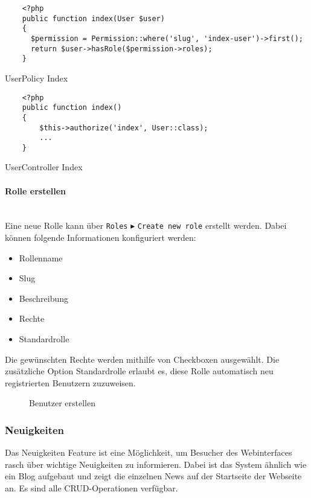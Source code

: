 \begin{listing}[H]
  \begin{verbatim}
    <?php
    public function index(User $user)
    {
      $permission = Permission::where('slug', 'index-user')->first();
      return $user->hasRole($permission->roles);
    }
  \end{verbatim}
  \caption{UserPolicy Index}
\end{listing}

\begin{listing}[H]
  \begin{verbatim}
    <?php
    public function index()
    {
        $this->authorize('index', User::class);
        ...
    }
  \end{verbatim}
  \caption{UserController Index}
\end{listing}

\paragraph{Rolle erstellen}\mbox{}\\
Eine neue Rolle kann über \verb|Roles| $\blacktriangleright$ 
\verb|Create new role| erstellt werden. Dabei können
folgende Informationen konfiguriert werden:

\begin{itemize}
  \item Rollenname
  \item Slug
  \item Beschreibung
  \item Rechte
  \item Standardrolle
\end{itemize}

Die gewünschten Rechte werden mithilfe von Checkboxen ausgewählt. Die
zusätzliche Option Standardrolle erlaubt es, diese Rolle automatisch neu
registrierten Benutzern zuzuweisen.

\begin{figure}[H]
  \centering
  \caption{Benutzer erstellen}
\end{figure}

\subsubsection{Neuigkeiten}
Das Neuigkeiten Feature ist eine Möglichkeit, um Besucher des Webinterfaces
rasch über wichtige Neuigkeiten zu informieren. Dabei ist das System ähnlich
wie ein Blog aufgebaut und zeigt die einzelnen News auf der Startseite der
Webseite an. Es sind alle CRUD-Operationen verfügbar.

